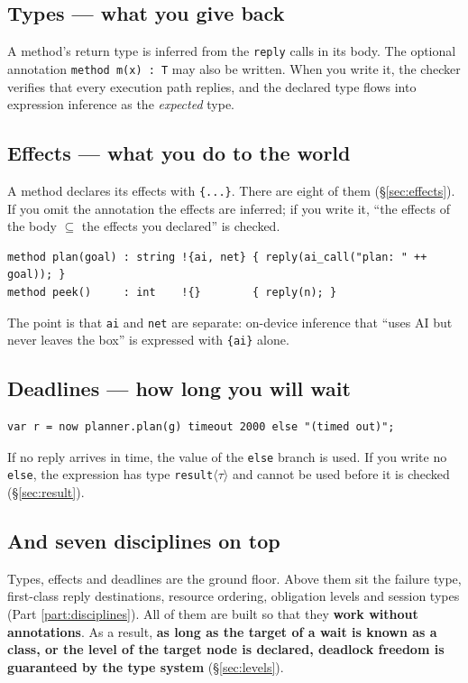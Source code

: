 \documentclass[11pt,a4paper]{article}
\newcommand{\eff}[1]{\texttt{\{#1\}}}
\begin{document}
\subsection{Types --- what you give back}

A method's return type is inferred from the \texttt{reply} calls in its body.
The optional annotation \texttt{method m(x) : T} may also be written. When you
write it, the checker verifies that every execution path replies, and the
declared type flows into expression inference as the \emph{expected} type.

\subsection{Effects --- what you do to the world}

A method declares its effects with \eff{...}. There are eight of them
(\S\ref{sec:effects}). If you omit the annotation the effects are inferred; if
you write it, ``the effects of the body $\subseteq$ the effects you declared''
is checked.

\begin{lstlisting}
method plan(goal) : string !{ai, net} { reply(ai_call("plan: " ++ goal)); }
method peek()     : int    !{}        { reply(n); }
\end{lstlisting}

The point is that \texttt{ai} and \texttt{net} are separate: on-device
inference that ``uses AI but never leaves the box'' is expressed with \eff{ai}
alone.

\subsection{Deadlines --- how long you will wait}

\begin{lstlisting}
var r = now planner.plan(g) timeout 2000 else "(timed out)";
\end{lstlisting}

If no reply arrives in time, the value of the \texttt{else} branch is used.
If you write no \texttt{else}, the expression has type
\texttt{result}$\langle\tau\rangle$ and cannot be used before it is checked
(\S\ref{sec:result}).

\subsection{And seven disciplines on top}

Types, effects and deadlines are the ground floor. Above them sit the failure
type, first-class reply destinations, resource ordering, obligation levels and
session types (Part \ref{part:disciplines}). All of them are built so that they
\textbf{work without annotations}. As a result, \textbf{as long as the target of
a wait is known as a class, or the level of the target node is declared,
deadlock freedom is guaranteed by the type system} (\S\ref{sec:levels}).
\end{document}
